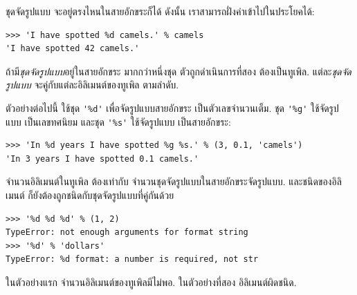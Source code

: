
ชุดจัดรูปแบบ จะอยู่ตรงไหนในสายอักขระก็ได้
ดังนั้น เราสามารถฝั่งค่าเข้าไปในประโยคได้:

\begin{verbatim}
>>> 'I have spotted %d camels.' % camels
'I have spotted 42 camels.'
\end{verbatim}
%
%
ถ้ามี\textit{ชุดจัดรูปแบบ}อยู่ในสายอักขระ มากกว่าหนึ่งชุด
ตัวถูกดำเนินการที่สอง ต้องเป็นทูเพิล.
แต่ละ\textit{ชุดจัดรูปแบบ} จะคู่กับแต่ละอิลิเมนต์ของทูเพิล ตามลำดับ.


ตัวอย่างต่อไปนี้ ใช้ชุด \verb|'%d'| เพื่อจัดรูปแบบสายอักขระ เป็นตัวเลขจำนวนเต็ม.
ชุด \verb|'%g'| ใช้จัดรูปแบบ เป็นเลขทศนิยม
และชุด \verb|'%s'| ใช้จัดรูปแบบ เป็นสายอักขระ:

\begin{verbatim}
>>> 'In %d years I have spotted %g %s.' % (3, 0.1, 'camels')
'In 3 years I have spotted 0.1 camels.'
\end{verbatim}
%
%
จำนวนอิลิเมนต์ในทูเพิล ต้องเท่ากับ
จำนวนชุดจัดรูปแบบในสายอักขระจัดรูปแบบ.
และชนิดของอิลิเมนต์ ก็ยังต้องถูกชนิดกับชุดจัดรูปแบบที่คู่กันด้วย



\begin{verbatim}
>>> '%d %d %d' % (1, 2)
TypeError: not enough arguments for format string
>>> '%d' % 'dollars'
TypeError: %d format: a number is required, not str
\end{verbatim}
%
%
ในตัวอย่างแรก จำนวนอิลิเมนต์ของทูเพิลมีไม่พอ.
ในตัวอย่างที่สอง อิลิเมนต์ผิดชนิด.


